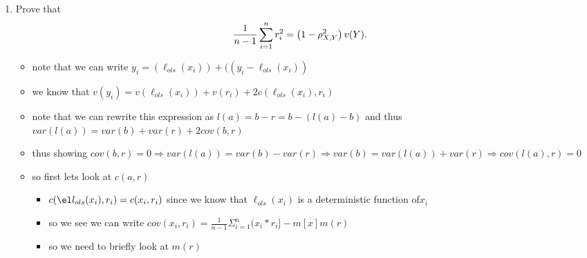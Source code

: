 \documentclass[12pt,twoside]{article}
\begin{document}
\begin{enumerate}
\begin{enumerate}
\item Prove that 
\begin{align}
\frac{1}{n-1} \sum_{i=1}^{n} r_i^2 & = \left( 1 - \rho_{X,Y}^2 \right) v(Y).
\end{align}
\begin{itemize}
    \item note that we can write $y_i=(\ell_{ols}(x_i))+((y_i-\ell_{ols}(x_i))$
    \item we know that $v(y_i)=v(\ell_{ols}(x_i))+v(r_i)+2c(\ell_{ols}(x_i),r_i)$
    \item note that we can rewrite this expression as $l(a)=b-r=b-(l(a)-b)$ and thus $var(l(a))=var(b)+var(r)+2cov(b,r)$
    \item thus showing $cov(b,r)=0\Rightarrow var(l(a))=var(b)-var(r)\Rightarrow var(b)=var(l(a))+var(r)\Rightarrow cov(l(a),r)=0 $
    \item so first lets look at $c(a,r)$ 
    \begin{itemize}
        \item $c(\el  l_{ols}(x_i),r_i)=c(x_i,r_i)$ since we know that $\ell_{ols}(x_i)$  is a deterministic function of$x_i$
        \item so we see we can write $cov(x_i,r_i)=\frac{1}{n-1}\Sigma_{i=1}^{n}(x_i*r_i]-m[x]m(r)$
        \item so we need to briefly look at $m(r)$
\end{itemize}
\end{itemize}
\end{enumerate}
\end{enumerate}
\end{document}
